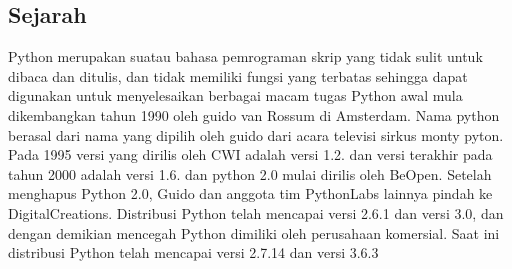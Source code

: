 \subsection{Sejarah}
Python merupakan suatau bahasa pemrograman skrip yang tidak sulit untuk dibaca dan ditulis, dan tidak memiliki fungsi yang terbatas sehingga dapat digunakan untuk menyelesaikan berbagai macam tugas
Python awal mula dikembangkan tahun 1990 oleh guido van Rossum di Amsterdam. Nama python berasal dari nama yang dipilih oleh guido dari acara televisi sirkus monty pyton.
Pada 1995 versi yang dirilis oleh CWI adalah versi 1.2. dan versi terakhir pada tahun 2000 adalah versi 1.6. dan python 2.0 mulai dirilis oleh BeOpen. Setelah menghapus Python 2.0, Guido dan anggota tim PythonLabs lainnya pindah ke DigitalCreations. Distribusi Python telah mencapai versi 2.6.1 dan versi 3.0, dan dengan demikian mencegah Python dimiliki oleh perusahaan komersial. Saat ini distribusi Python telah mencapai versi 2.7.14 dan versi 3.6.3

